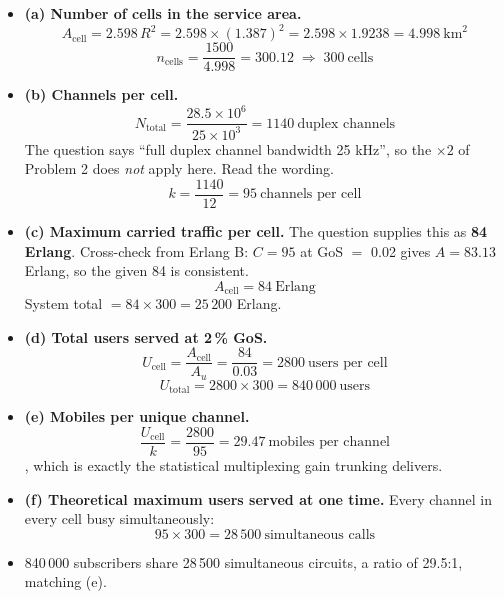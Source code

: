 \begin{itemize}
  \item \textbf{(a) Number of cells in the service area.}
        \[ A_{\text{cell}} = 2.598\,R^2 = 2.598 \times (1.387)^2 = 2.598 \times 1.9238
           = 4.998\ \text{km}^2 \]
        \[ n_{\text{cells}} = \frac{1500}{4.998} = 300.12 \;\Rightarrow\;
           \boxed{300\ \text{cells}} \]
  \item \textbf{(b) Channels per cell.}
        \[ N_{\text{total}} = \frac{28.5 \times 10^{6}}{25 \times 10^{3}}
           = 1140\ \text{duplex channels} \]
        {\color{sub}\footnotesize The question says ``full duplex channel bandwidth 25 kHz'', so
        the $\times 2$ of Problem 2 does \emph{not} apply here. Read the wording.}
        \[ k = \frac{1140}{12} = \boxed{95\ \text{channels per cell}} \]
  \item \textbf{(c) Maximum carried traffic per cell.}
        The question supplies this as \textbf{84 Erlang}.
        {\color{sub}\footnotesize Cross-check from Erlang B: $C = 95$ at GoS $=$ 0.02 gives
        $A = 83.13$ Erlang, so the given 84 is consistent.}
        \[ A_{\text{cell}} = \boxed{84\ \text{Erlang}} \]
        System total $= 84 \times 300 = 25\,200$ Erlang.
  \item \textbf{(d) Total users served at 2\,\% GoS.}
        \[ U_{\text{cell}} = \frac{A_{\text{cell}}}{A_u} = \frac{84}{0.03} = 2800
           \ \text{users per cell} \]
        \[ U_{\text{total}} = 2800 \times 300 = \boxed{840\,000\ \text{users}} \]
  \item \textbf{(e) Mobiles per unique channel.}
        \[ \frac{U_{\text{cell}}}{k} = \frac{2800}{95} = \boxed{29.47\ \text{mobiles per channel}} \]
        , which is exactly the statistical
        multiplexing gain trunking delivers.
  \item \textbf{(f) Theoretical maximum users served at one time.}
        Every channel in every cell busy simultaneously:
        \[ 95 \times 300 = \boxed{28\,500\ \text{simultaneous calls}} \]
  \item {} 840\,000 subscribers share 28\,500 simultaneous
        circuits, a ratio of 29.5:1, matching (e). \checkmark
\end{itemize}

\hr

{\color{sub}\footnotesize {} }

